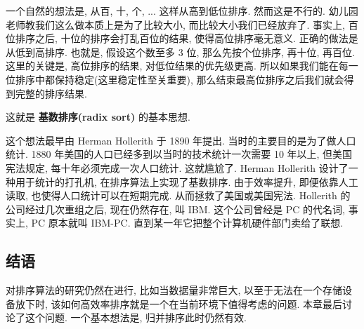 \documentclass[a4paper]{ctexart}
\theoremstyle{definition}
\theoremstyle{definition}
\begin{document}
一个自然的想法是, 从百, 十, 个, ... 这样从高到低位排序. 然而这是不行的.
幼儿园老师教我们这么做本质上是为了比较大小, 而比较大小我们已经放弃了.
事实上, 百位排序之后, 十位的排序会打乱百位的结果, 使得高位排序毫无意义.
正确的做法是从低到高排序. 也就是, 假设这个数至多 3 位, 那么先按个位排序,
再十位, 再百位. 这里的关键是, 高位排序的结果, 对低位结果的优先级更高.
所以如果我们能在每一位排序中都保持稳定(这里稳定性至关重要),
那么结束最高位排序之后我们就会得到完整的排序结果.


这就是 {\bf 基数排序(radix sort)} 的基本思想.

这个想法最早由 Herman Hollerith 于 1890 年提出.
当时的主要目的是为了做人口统计.
1880 年美国的人口已经多到以当时的技术统计一次需要 10 年以上, 但美国宪法规定,
每十年必须完成一次人口统计. 这就尴尬了. Herman Hollerith 设计了一种用于统计的打孔机,
在排序算法上实现了基数排序. 由于效率提升, 即便依靠人工读取, 也使得人口统计可以在短期完成.
从而拯救了美国或美国宪法. Hollerith 的公司经过几次重组之后, 现在仍然存在,
叫 IBM. 这个公司曾经是 PC 的代名词, 事实上, PC 原本就叫 IBM-PC.
直到某一年它把整个计算机硬件部门卖给了联想. 

\subsection{结语}
对排序算法的研究仍然在进行, 比如当数据量非常巨大, 以至于无法在一个存储设备放下时,
该如何高效率排序就是一个在当前环境下值得考虑的问题. 本章最后讨论了这个问题.
一个基本想法是, 归并排序此时仍然有效.





\end{document}
